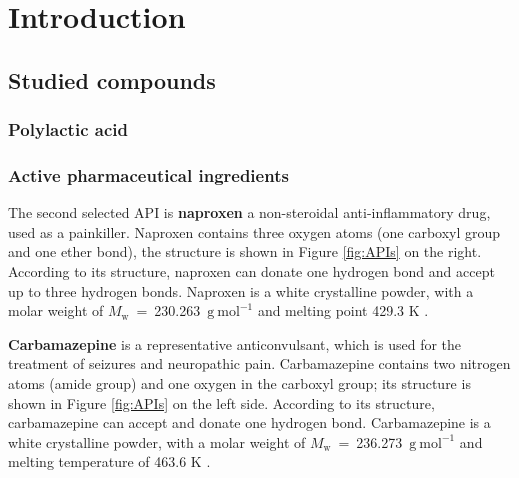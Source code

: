 \documentclass[11pt,a4paper,twoside,openright]{report}
\begin{document}
	
	
	
	\setcounter{tocdepth}{2}
	\tableofcontents
	
	\chapter{Introduction}
	\pagestyle{fancy}

	\section{Studied compounds}
    \subsection{Polylactic acid}

    \subsection{Active pharmaceutical ingredients}
    
    
    The second selected API is \textbf{naproxen} a non-steroidal anti-inflammatory drug, used as a painkiller. Naproxen contains three oxygen atoms (one carboxyl group and one ether bond), the structure is shown in Figure \ref{fig:APIs} on the right. According to its structure, naproxen can donate one hydrogen bond and accept up to three hydrogen bonds. Naproxen is a white crystalline powder, with a molar weight of $M_\mathrm{w}$~=~230.263~$\mathrm{g\ mol^{-1}}$ and melting point 429.3 K \cite{stejfa}. 
    
    \textbf{Carbamazepine} is a representative anticonvulsant, which is used for the treatment of seizures and neuropathic pain. Carbamazepine contains two nitrogen atoms (amide group) and one oxygen in the carboxyl group; its structure is shown in Figure \ref{fig:APIs} on the left side. According to its structure, carbamazepine can accept and donate one hydrogen bond. Carbamazepine is a white crystalline powder, with a molar weight of $M_\mathrm{w}$~=~236.273~$\mathrm{g\ mol^{-1}}$ and melting temperature of 463.6 K \cite{stejfa}.
    
\end{document}
